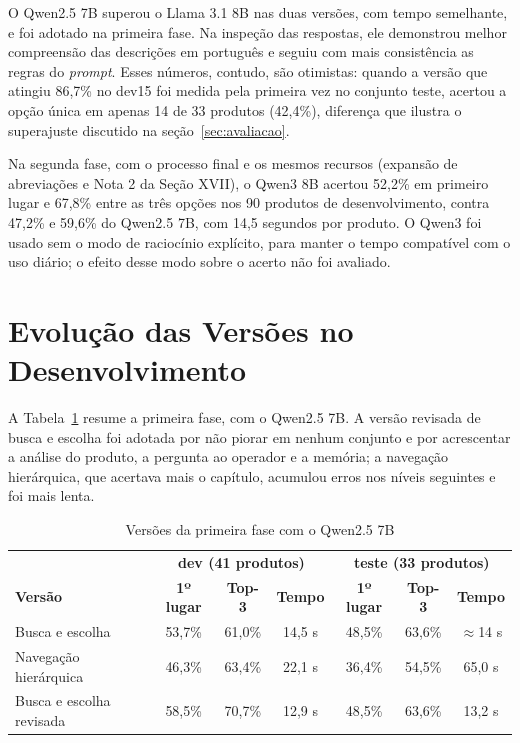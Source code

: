 O Qwen2.5 7B superou o Llama 3.1 8B nas duas versões, com tempo semelhante, e foi adotado na primeira fase. Na inspeção das respostas, ele demonstrou melhor compreensão das descrições em português e seguiu com mais consistência as regras do \textit{prompt}. Esses números, contudo, são otimistas: quando a versão que atingiu 86,7\% no dev15 foi medida pela primeira vez no conjunto teste, acertou a opção única em apenas 14 de 33 produtos (42,4\%), diferença que ilustra o superajuste discutido na seção~\ref{sec:avaliacao}.

Na segunda fase, com o processo final e os mesmos recursos (expansão de abreviações e Nota 2 da Seção XVII), o Qwen3 8B acertou 52,2\% em primeiro lugar e 67,8\% entre as três opções nos 90 produtos de desenvolvimento, contra 47,2\% e 59,6\% do Qwen2.5 7B, com 14,5 segundos por produto. O Qwen3 foi usado sem o modo de raciocínio explícito, para manter o tempo compatível com o uso diário; o efeito desse modo sobre o acerto não foi avaliado.

\section{Evolução das Versões no Desenvolvimento}

A Tabela~\ref{tab:versoes_fase1} resume a primeira fase, com o Qwen2.5 7B. A versão revisada de busca e escolha foi adotada por não piorar em nenhum conjunto e por acrescentar a análise do produto, a pergunta ao operador e a memória; a navegação hierárquica, que acertava mais o capítulo, acumulou erros nos níveis seguintes e foi mais lenta.

\begin{table}[H]
\centering
\caption{Versões da primeira fase com o Qwen2.5 7B}
\label{tab:versoes_fase1}
\begin{tabular}{p{3.6cm} c c c c c c}
\hline
 & \multicolumn{3}{c}{\textbf{dev (41 produtos)}} & \multicolumn{3}{c}{\textbf{teste (33 produtos)}} \\
\textbf{Versão} & \textbf{1º lugar} & \textbf{Top-3} & \textbf{Tempo} & \textbf{1º lugar} & \textbf{Top-3} & \textbf{Tempo} \\
\hline
Busca e escolha & 53,7\% & 61,0\% & 14,5 s & 48,5\% & 63,6\% & $\approx$14 s \\
Navegação hierárquica & 46,3\% & 63,4\% & 22,1 s & 36,4\% & 54,5\% & 65,0 s \\
Busca e escolha revisada & 58,5\% & 70,7\% & 12,9 s & 48,5\% & 63,6\% & 13,2 s \\
\hline
\end{tabular}
\end{table}

